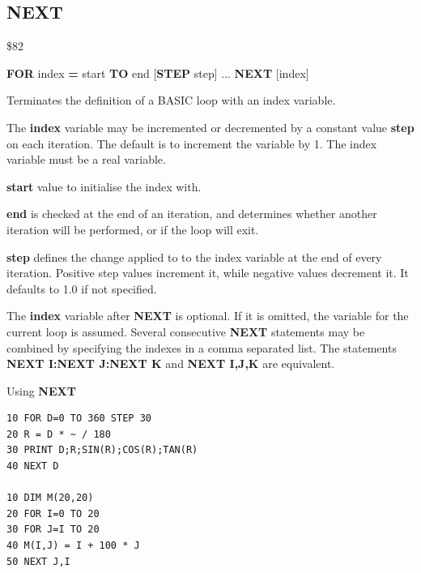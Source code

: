 \subsection{NEXT}
\begin{description}[leftmargin=2cm,style=nextline]
\item [Token:] \$82
\item [Format:] {\bf FOR} index {\bf =} start {\bf TO} end
		[{\bf STEP} step] ... {\bf NEXT} [index]
\item [Usage:] Terminates the definition
               of a BASIC loop with an index variable.

               The {\bf index} variable may be incremented or decremented
               by a constant value {\bf step} on each iteration. The default
               is to increment the variable by 1.
               The index variable must be a real variable.

               {\bf start} value to initialise the index with.

               {\bf end} is checked at the end of an iteration,
               and determines whether another iteration will be performed,
               or if the loop will exit.

               {\bf step} defines the change applied to
               to the index variable at the end of every iteration.
               Positive step values increment it, while negative values
               decrement it. It defaults to 1.0 if not specified.

\item [Remarks:] The {\bf index} variable after {\bf NEXT} is
               optional. If it is omitted, the variable
               for the current loop is assumed.
               Several consecutive {\bf NEXT} statements may be
               combined by specifying the indexes in a comma
               separated list. The statements
               {\bf NEXT I:NEXT J:NEXT K} and
               {\bf NEXT I,J,K} are equivalent.

\item [Example:] Using {\bf NEXT}
\begin{tcolorbox}[colback=black,coltext=white]
\verbatimfont{\codefont}
\begin{verbatim}
10 FOR D=0 TO 360 STEP 30
20 R = D * ~ / 180
30 PRINT D;R;SIN(R);COS(R);TAN(R)
40 NEXT D

10 DIM M(20,20)
20 FOR I=0 TO 20
30 FOR J=I TO 20
40 M(I,J) = I + 100 * J
50 NEXT J,I
\end{verbatim}
\end{tcolorbox}
\end{description}

